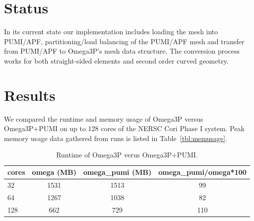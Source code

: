 \documentclass[a4paper]{article}
\begin{document}
\section{Status}
In its current state our implementation includes loading the mesh into PUMI/APF, partitioning/load balancing of the PUMI/APF mesh and transfer from PUMI/APF to Omega3P's mesh data structure. The conversion process works for both straight-sided elements and second order curved geometry.

\section{Results}

We compared the runtime and memory usage of Omega3P versus Omega3P+PUMI on
up to 128 cores of the NERSC Cori Phase I system.
Peak memory usage data gathered from runs is listed in Table~\ref{tbl:memusage}.

\begin{table}[h]
\centering
  \caption{Runtime of Omega3P verus Omega3P+PUMI.}
\label{tbl:time}
  \begin{tabular}{l|ccc}
    cores & omega (MB) & omega\_pumi (MB) & omega\_pumi/omega*100 \\
    \hline
    32    & 1531       & 1513             & 99                    \\
    64    & 1267       & 1038             & 82                    \\
    128   & 662        & 729              & 110
\end{tabular}
\end{table}

\newpage


\end{document}
